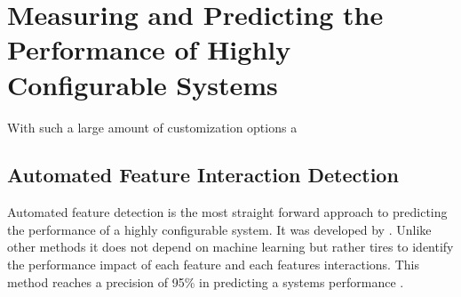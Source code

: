 \section{Measuring and Predicting the Performance of Highly Configurable Systems}

With such a large amount of customization options a 

\subsection{Automated Feature Interaction Detection}


\let\oldPi\Pi
\renewcommand{\Pi}{\ensuremath{\mathrm{\oldPi}}}
\let\oldRef\ref
\renewcommand{\ref}[1]{(\oldRef{#1})}

Automated feature detection is the most straight forward approach to predicting the performance of a highly configurable system.
It was developed by \citet{AutomatedFeatureDetectionSiegmund2012}. Unlike other methods it does not depend on machine learning but rather tires to identify the performance impact of each feature and each features interactions. This method reaches a precision of 95\% in predicting a systems performance \cite{AutomatedFeatureDetectionSiegmund2012}. 

